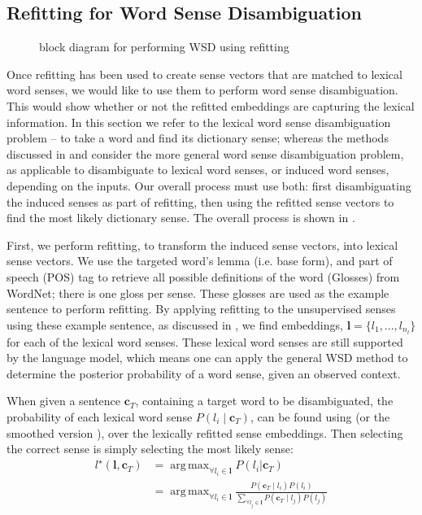 \documentclass{sig-alternate}
\renewcommand{\c}{\mathbf{c}}
\renewcommand{\l}{\mathbf{l}}
\DeclareMathOperator*{\argmax}{arg\,max}
\begin{document}
\subsection{Refitting for Word Sense Disambiguation} 
\begin{figure}
	\begin{adjustbox}{max width=\columnwidth}
		
	\end{adjustbox}
	\caption{ block diagram for performing WSD using refitting \label{WSDBlock}} 
\end{figure}
Once refitting has been used to create sense vectors that are matched to lexical word senses, we would like to use them to perform word sense disambiguation. This would show whether or not the refitted embeddings are capturing the lexical information. In this section we refer to the lexical word sense disambiguation problem -- to take a word and find its dictionary sense; whereas the methods discussed in  and  consider the more general word sense disambiguation problem, as applicable to disambiguate to lexical word senses, or induced word senses, depending on the inputs.
Our overall process must use both: first disambiguating the induced senses as part of refitting, then using the refitted sense vectors to find the most likely dictionary sense.
The overall process is shown in .

First, we perform refitting, to transform the induced sense vectors, into lexical sense vectors.
We use the targeted word's lemma (i.e. base form), and part of speech (POS) tag to retrieve all possible definitions of the word (Glosses) from WordNet; there is one gloss per sense. These glosses are used as the example sentence to perform refitting. By applying refitting to the unsupervised senses using these example sentence, as discussed in , we find embeddings, $\l=\{l_1,..., l_{n_l}\}$ for each of the lexical word senses. These lexical word senses are still supported by the language model, which means one can apply the general WSD method to determine the posterior probability of a word sense, given an observed context. 

When given a sentence $\c_{T}$, containing a target word to be disambiguated, 
the probability of each lexical word sense $P(l_i \mid \c_{T})$, can be found using  (or the smoothed version ), over the lexically refitted sense embeddings. Then selecting the correct sense is simply selecting the most likely sense:
\begin{equation}
\begin{aligned}\label{eq:lexicalwsd}
l^\star (\l, \c_T) &= \argmax_{\forall l_i \in \l} P(l_i|\c_T) \\
&= \argmax_{\forall l_i \in \l} \frac{P(\c_T \mid l_i)P(l_i)}{\sum_{\forall l_j \in \l} P(\c_T \mid l_j)P(l_j)}
\end{aligned}
\end{equation}
\end{document}
